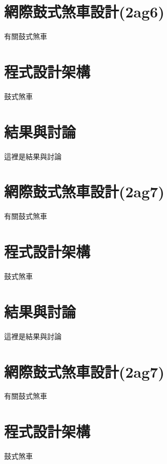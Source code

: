 \documentclass[]{article}
\begin{document}
\section{網際鼓式煞車設計(2ag6)}\label{ux7db2ux969bux9f13ux5f0fux715eux8ecaux8a2dux8a082ag6}

有關鼓式煞車

\section{程式設計架構}\label{ux7a0bux5f0fux8a2dux8a08ux67b6ux69cb-3}

鼓式煞車

\section{結果與討論}\label{ux7d50ux679cux8207ux8a0eux8ad6-4}

這裡是結果與討論

\section{網際鼓式煞車設計(2ag7)}\label{ux7db2ux969bux9f13ux5f0fux715eux8ecaux8a2dux8a082ag7}

有關鼓式煞車

\section{程式設計架構}\label{ux7a0bux5f0fux8a2dux8a08ux67b6ux69cb-4}

鼓式煞車

\section{結果與討論}\label{ux7d50ux679cux8207ux8a0eux8ad6-5}

這裡是結果與討論

\section{網際鼓式煞車設計(2ag7)}\label{ux7db2ux969bux9f13ux5f0fux715eux8ecaux8a2dux8a082ag7-1}

有關鼓式煞車

\section{程式設計架構}\label{ux7a0bux5f0fux8a2dux8a08ux67b6ux69cb-5}

鼓式煞車
\end{document}
